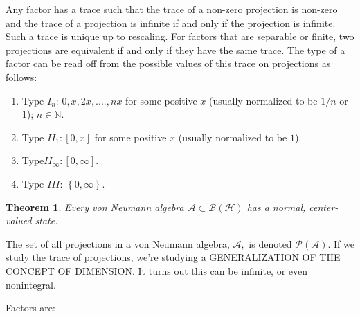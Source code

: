 \documentclass[aps,preprint]{revtex4}%
\newtheorem{theorem}{Theorem}
\begin{document}
Any factor has a trace such that the trace of a non-zero projection is
non-zero and the trace of a projection is infinite if and only if the
projection is infinite. Such a trace is unique up to rescaling. For factors
that are separable or finite, two projections are equivalent if and only if
they have the same trace. The type of a factor can be read off from the
possible values of this trace on projections as follows:

\begin{enumerate}
\item Type $I_{n}$: $0,x,2x,....,nx$ for some positive $x$ (usually normalized
to be $1/n$ or $1$); $n\in\mathbb{N}.$

\item Type $II_{1}:[0,x]$ for some positive $x$ (usually normalized to be $1$).

\item Type$II_{\infty}:[0,\infty]$.

\item Type $III$: $\left\{  0,\infty\right\}  $.
\end{enumerate}

\begin{theorem}
Every von Neumann algebra $\mathcal{A}\subset\mathcal{B(H)}$ has a normal,
center-valued state.
\end{theorem}

The set of all projections in a von Neumann algebra, $\mathcal{A},$ is denoted
$\mathcal{P}\left(  \mathcal{A}\right)  .$ If we study the trace of
projections, we're studying a GENERALIZATION OF THE CONCEPT OF DIMENSION. It
turns out this can be infinite, or even nonintegral.

Factors are:
\end{document}
